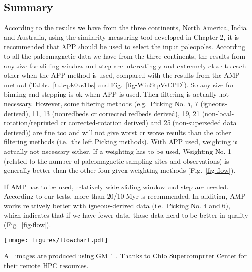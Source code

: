 \subsection{Summary}

According to the results we have from the three continents, North America, India
and Australia, using the similarity measuring tool developed in Chapter 2, it is
recommended that APP should be used to select the input paleopoles. According to
all the paleomagnetic data we have from the three continents, the results from
any size for sliding window and step are interestingly and extremely close to
each other when the APP method is used, compared with the results from the AMP
method (Table.~\ref{tab-pk0vs1bs} and Fig.~\ref{fig-WinStpVsCPD}). So any size
for binning and stepping is ok when APP is used. Then filtering is actually not
necessary. However, some filtering methods (e.g.\ Picking No. 5, 7
(igneous-derived), 11, 13 (nonredbeds or corrected redbeds derived), 19, 21
(non-local-rotation/reprinted or corrected-rotation derived) and 25
(non-superseded data derived)) are fine too and will not give worst or worse
results than the other filtering methods (i.e.\ the left Picking methods). With
APP used, weighting is actually not necessary either. If a weighting has to be
used, Weighting No. 1 (related to the number of paleomagnetic sampling sites and
observations) is generally better than the other four given weighting methods
(Fig.~\ref{fig-flow}).

If AMP has to be used, relatively wide sliding window and step are needed.
According to our tests, more than 20/10 Myr is recommended. In addition, AMP
works relatively better with igneous-derived data (i.e.\ Picking No. 4 and 6),
which indicates that if we have fewer data, these data need to be better in
quality (Fig.~\ref{fig-flow}).

\begin{figure*}
\centering
\texttt{[image: figures/flowchart.pdf]}
\caption[Flowchart]{Flowchart for recommended procedure of processing
  paleomagnetic data.}\label{fig-flow}
\end{figure*}

\begin{acknowledgments}
All images are produced using GMT~\cite{W13}. Thanks to Ohio Supercomputer
Center for their remote HPC resources.
\end{acknowledgments}

